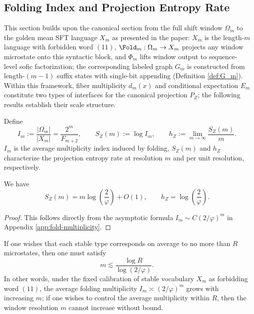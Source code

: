 \subsection{Folding Index and Projection Entropy Rate}\label{subsec:pom-projection-entropy}
This section builds upon the canonical section from the full shift window $\Omega_m$ to the golden mean SFT language $X_m$ as presented in the paper: $X_m$ is the length-$m$ language with forbidden word $(11)$, $\Fold_m:\Omega_m\to X_m$ projects any window microstate onto this syntactic block, and $\Phi_m$ lifts window output to sequence-level sofic factorization; the corresponding labeled graph $G_m$ is constructed from length-$(m-1)$ suffix states with single-bit appending (Definition \ref{def:G_m}). Within this framework, fiber multiplicity $d_m(x)$ and conditional expectation $E_m$ constitute two types of interfaces for the canonical projection $P_Z$; the following results establish their scale structure.
\begin{definition}\label{def:pom-fold-index}
Define
\[
I_m:=\frac{|\Omega_m|}{|X_m|}=\frac{2^m}{F_{m+2}},
\qquad
S_Z(m):=\log I_m,
\qquad
h_Z:=\lim_{m\to\infty}\frac{S_Z(m)}{m}.
\]
$I_m$ is the average multiplicity index induced by folding, $S_Z(m)$ and $h_Z$ characterize the projection entropy rate at resolution $m$ and per unit resolution, respectively.
\end{definition}

\begin{proposition}\label{prop:pom-projection-entropy}
We have
\[
S_Z(m)=m\log\!\left(\frac{2}{\varphi}\right)+O(1),
\qquad
h_Z=\log\!\left(\frac{2}{\varphi}\right).
\]
\end{proposition}
\begin{proof}
This follows directly from the asymptotic formula
\(
I_m\sim C(2/\varphi)^m
\)
in Appendix \ref{app:fold-multiplicity}.
\end{proof}

\begin{corollary}\label{cor:pom-resolution-threshold}
If one wishes that each stable type corresponds on average to no more than $R$ microstates, then one must satisfy
\[
m\lesssim \frac{\log R}{\log(2/\varphi)}.
\]
In other words, under the fixed calibration of stable vocabulary $X_m$ as forbidding word $(11)$, the average folding multiplicity $I_m\asymp (2/\varphi)^m$ grows with increasing $m$; if one wishes to control the average multiplicity within $R$, then the window resolution $m$ cannot increase without bound.
\end{corollary}

